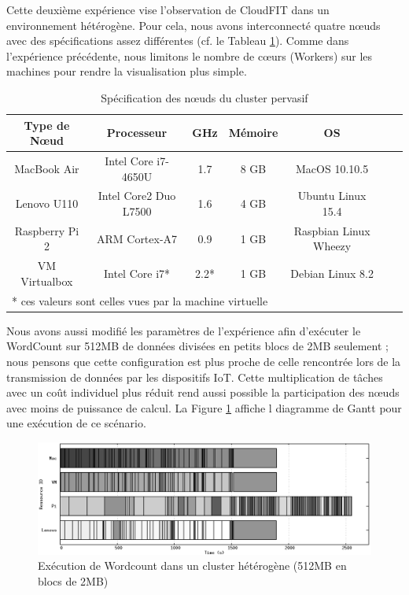 Cette deuxième expérience vise l'observation de CloudFIT dans un environnement hétérogène. Pour cela, nous avons interconnecté quatre n{\oe}uds avec des spécifications assez différentes (cf. le Tableau \ref{Table:laptops}). Comme dans l'expérience précédente, nous limitons le nombre de c{\oe}urs (Workers) sur les machines pour rendre la visualisation plus simple.

\begin{table}
	\begin{center}
		\begin{tabular}{|c|c|c|c|c|c|c|}
			\hline
			Type de N{\oe}ud & Processeur & GHz &  Mémoire & OS\\
			\hline
			\hline
			MacBook Air & Intel Core i7-4650U & 1.7   & 8 GB & MacOS 10.10.5 \\
			Lenovo U110 & Intel Core2 Duo L7500 & 1.6   & 4 GB & Ubuntu Linux 15.4 \\
			Raspberry Pi 2 & ARM Cortex-A7 & 0.9  & 1 GB & Raspbian Linux Wheezy\\
			VM Virtualbox & Intel Core i7* & 2.2*  &  1 GB & Debian Linux 8.2 \\
			\hline
			\multicolumn{5}{l}{* ces valeurs sont celles vues par la machine virtuelle}
		\end{tabular}
	\end{center}
	\caption{\label{Table:laptops}Spécification des n{\oe}uds du cluster pervasif}
\end{table} 

Nous avons aussi modifié les paramètres de l'expérience afin d'exécuter le WordCount sur 512MB de données divisées en petits blocs de 2MB seulement ; nous pensons que cette configuration est plus proche de celle rencontrée lors de la transmission de données par les dispositifs IoT. Cette multiplication de tâches avec un coût individuel plus réduit rend aussi possible la participation des n{\oe}uds avec moins de puissance de calcul.  La Figure \ref{fig:hetero} affiche l diagramme de Gantt pour une exécution de ce scénario. 

\begin{figure}
	\begin{center}
		\includegraphics[width=1\linewidth]{img/hetero2}
		\caption{Exécution de Wordcount dans un cluster hétérogène (512MB en blocs de 2MB)}\label{fig:hetero}
	\end{center}
\end{figure}


